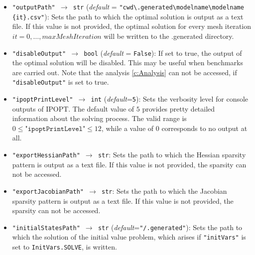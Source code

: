 \documentclass[12pt]{article}
\begin{document}
\begin{mdframed}[backgroundcolor=gray!10, roundcorner=10pt,
		linewidth=1pt]
\begin{itemize}
			
			\label{flag:outputPath}
			\item \texttt{"outputPath" $\rightarrow$ str} (\emph{default} = \texttt{"cwd\textbackslash .generated\textbackslash modelname\textbackslash modelname\\\{it\}.csv"}): Sets the path to
			which the optimal solution is output as a text file. If this
			value is not provided,
			the optimal solution for every mesh iteration $it=0, \ldots,
			maxMeshIteration$ will be written to the .generated directory.
			
			\label{flag:disableOutput}
			\item \texttt{"disableOutput" $\rightarrow$ bool} (\emph{default} = \texttt{False}): If set to true, the output of the optimal solution will be disabled. This may be useful when benchmarks are carried out.
			Note that the analysis \eqref{c:Analysis} can not be accessed, if \texttt{"disableOutput"} is set to true.

		      \label{flag:ipoptPrintLevel}
		\item \texttt{"ipoptPrintLevel" $\rightarrow$ int}
		      (\emph{default}=\texttt{5}): Sets the verbosity level for
		      console outputs of IPOPT. The default value of $5$ provides pretty detailed
		      information about the solving process. The valid range is $0 \leq
			      \texttt{"ipoptPrintLevel"} \leq 12$, while a value of $0$ corresponds to no
		      output at all.

		      \label{flag:exportHessianPath}
		\item \texttt{"exportHessianPath" $\rightarrow$ str}: Sets the
		      path to
		      which the Hessian sparsity pattern is output as a text
		      file. If this value is
		      not provided, the sparsity can not be accessed.

		      \label{flag:exportJacobianPath}
		\item \texttt{"exportJacobianPath" $\rightarrow$ str}: Sets the
		      path to
		      which the Jacobian sparsity pattern is output as a text
		      file. If this value is
		      not provided, the sparsity can not be accessed.

		      \label{flag:initialStatesPath}
		\item \texttt{"initialStatesPath" $\rightarrow$ str}
		      (\emph{default}=\texttt{"/.generated"}): Sets the path to
		      which the solution of
		      the initial value problem, which arises if
		      \texttt{"initVars"} is set to
		      \texttt{InitVars.SOLVE}, is written.
		      

\end{itemize}
\end{mdframed}
\end{document}
